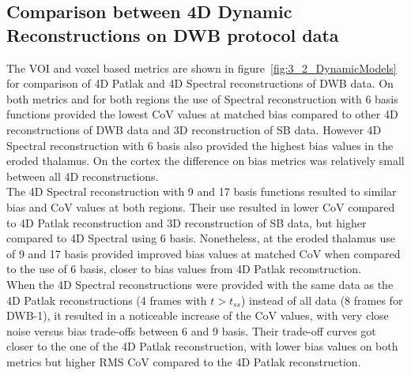 \subsection{Comparison between 4D Dynamic Reconstructions on DWB protocol data}
The VOI and voxel based metrics are shown in figure~\ref{fig:3_2_DynamicModels} for comparison of 4D Patlak and 4D Spectral reconstructions of DWB data.
On both metrics and for both regions the use of Spectral reconstruction with 6 basis functions provided the lowest CoV values at matched bias compared to other 4D reconstructions of DWB data and 3D reconstruction of SB data. However 4D Spectral reconstruction with 6 basis also provided the highest bias values in the eroded thalamus. On the cortex the difference on bias metrics was relatively small between all 4D reconstructions.\\
The 4D Spectral reconstruction with 9 and 17 basis functions resulted to similar bias and CoV values at both regions. Their use resulted in lower CoV compared to 4D Patlak reconstruction and 3D reconstruction of SB data, but higher compared to 4D Spectral using 6 basis. Nonetheless, at the eroded thalamus use of 9 and 17 basis provided improved bias values at matched CoV when compared to the use of 6 basis, closer to bias values from 4D Patlak reconstruction.\\
When the 4D Spectral reconstructions were provided with the same data as the 4D Patlak reconstructions (4 frames with $t>t_{ss}$) instead of all data (8 frames for DWB-1), it resulted in a noticeable increase of the CoV values, with very close noise versus bias trade-offs between 6 and 9 basis. Their trade-off curves got closer to the one of the 4D Patlak reconstruction, with lower bias values on both metrics but higher RMS CoV compared to the 4D Patlak reconstruction.


